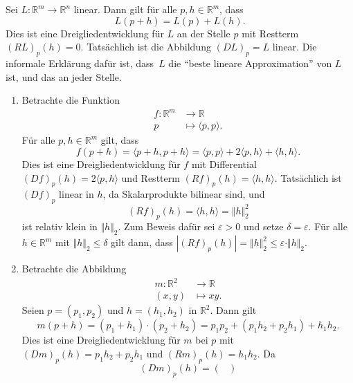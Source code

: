 \documentclass[../main.tex]{subfiles}
\begin{document}
\begin{example}
  Sei $L \colon \mathbb{R}^m \to \mathbb{R}^n$ linear.
  Dann gilt für alle $p, h \in \mathbb{R}^m$,
  dass
  \[
    L(p + h) = L(p) + L(h).
  \]
  Dies ist eine Dreigliedentwicklung für $L$ 
  an der Stelle $p$ mit Restterm ${(RL)}_p(h) = 0$.
  Tatsächlich ist die Abbildung ${(DL)}_p = L$ linear.
  Die informale Erklärung dafür ist,
  dass~$L$ die ``beste lineare Approximation'' von $L$ 
  ist, und das an jeder Stelle.
\end{example}

\begin{examples}
  \leavevmode
  \begin{enumerate}[(1)]
    \item Betrachte die Funktion
      \begin{align*}
        f \colon \mathbb{R}^m & \to \mathbb{R} \\
        p & \mapsto \langle p, p \rangle.
      \end{align*}
      Für alle $p, h \in \mathbb{R}^m$ gilt, dass
      \[
        f(p+ h) = \langle p + h, p + h \rangle
        = \langle p, p \rangle + 2 \langle p, h \rangle + \langle h, h \rangle.
      \]
      Dies ist eine Dreigliedentwicklung für $f$ mit
      Differential
      ${(Df)}_p(h) = 2 \langle p, h \rangle$ und
      Restterm
      ${(Rf)}_p(h) = \langle h, h \rangle$.
      Tatsächlich ist ${(Df)}_p$ linear in $h$,
      da Skalarprodukte bilinear sind, und
      \[
        {(Rf)}_p(h) = \langle h, h \rangle = \Vert h \Vert_2^2
      \]
      ist relativ klein in $\Vert h \Vert_2$.
      Zum Beweis dafür sei $\varepsilon > 0$ und setze
      $\delta = \varepsilon$.
      Für alle $h \in \mathbb{R}^m$ mit $\Vert h \Vert_2 \leq \delta$ 
      gilt dann, dass
      \(
        |{(Rf)}_p(h)| = \Vert h \Vert_2^2 \leq \varepsilon \cdot \Vert h \Vert_2
      \).
    \item Betrachte die Abbildung
      \begin{align*}
        m \colon \mathbb{R}^2 & \to \mathbb{R} \\
        (x, y) & \mapsto xy.
      \end{align*}
      Seien $p = (p_1, p_2)$ und $h = (h_1, h_2)$ in $\mathbb{R}^2$.
      Dann gilt
      \[
        m(p + h) = (p_1 + h_1) \cdot (p_2 + h_2)
        = p_1 p_2 + (p_1 h_2 + p_2 h_1) + h_1 h_2.
      \]
      Dies ist eine Dreigliedentwicklung für $m$ bei $p$
      mit ${(Dm)}_p(h) = p_1 h_2 + p_2 h_1$ und
      ${(Rm)}_p(h) = h_1 h_2$.
      Da
      \[
        {(Dm)}_p(h) =
        \begin{pmatrix}

\end{pmatrix}\]
\end{enumerate}
\end{examples}
\end{document}

